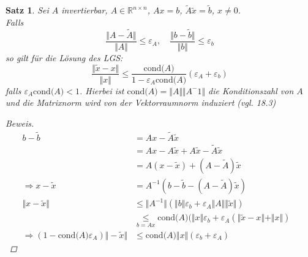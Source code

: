 \documentclass[12pt]{article}
\theoremstyle{break}
\newtheorem{theorem}{Satz}[subsection]
\begin{document}
\begin{theorem}
Sei $A$ invertierbar, $A \in \mathbb{R}^{n \times n}$, $Ax = b$, $\tilde{A} \tilde{x} = \tilde{b}$, $x \neq 0$. \\
Falls 
$$ \frac{\Vert A - \tilde{A} \Vert}{\Vert A \Vert} \leq \varepsilon_A, \quad \frac{\Vert b - \tilde{b} \Vert}{\Vert b \Vert} \leq \varepsilon_b$$
so gilt für die Lösung des LGS:
$$\frac{\Vert \tilde{x} - x \Vert }{\Vert x \Vert} \leq \frac{\text{cond($A$)}}{1- \varepsilon_A \text{cond($A$)}}(\varepsilon_A + \varepsilon_b)$$
falls $\varepsilon_A \text{cond($A$)} < 1$. Hierbei ist $\text{cond($A$)} = \Vert A \Vert \Vert A^-1 \Vert$ die Konditionszahl von $A$ und die Matrixnorm wird von der Vektorraumnorm induziert (vgl. 18.3)
\begin{proof}[Beweis]
\begin{align*}
b - \tilde{b} &= Ax - \tilde{A}\tilde{x} &\\
&= Ax - A\tilde{x} + A\tilde{x} - \tilde{A}\tilde{x} &\\
&= A(x-\tilde{x}) + (A- \tilde{A})\tilde{x} &\\
\Rightarrow x- \tilde{x} &= A^{-1} (b -\tilde{b} - (A - \tilde{A})\tilde{x}) &\\
\Vert x - \tilde{x} \Vert & \leq \Vert A^{-1} \Vert ( \Vert b \Vert \varepsilon_b + \varepsilon_A \Vert A \Vert \Vert \tilde{x} \Vert ) &\\
& \underset{b=Ax}{\leq} \text{cond($A$)} ( \Vert x \Vert \varepsilon_b + \varepsilon_A (\Vert \tilde{x} - x \Vert + \Vert x \Vert) &\\
\Rightarrow (1- \text{cond($A$)} \varepsilon_A) \Vert - \tilde{x} \Vert & \leq \text{cond($A$)} \Vert x \Vert (\varepsilon_b + \varepsilon_A)
\end{align*}
\end{proof}
\end{theorem}
\end{document}
